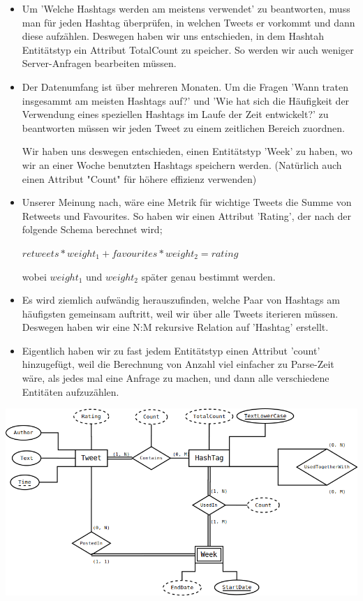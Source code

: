 \begin{itemize}
 \item Um 'Welche Hashtags werden am meistens verwendet' zu beantworten, muss man für jeden Hashtag überprüfen, in welchen Tweets er vorkommt und dann diese aufzählen. Deswegen haben wir uns entschieden, in dem Hashtah Entitätstyp ein Attribut TotalCount zu speicher. So werden wir auch weniger Server-Anfragen bearbeiten müssen.
 
 \item Der Datenumfang ist über mehreren Monaten. Um die Fragen 'Wann traten insgesammt am meisten Hashtags auf?' und 'Wie hat sich die Häufigkeit der Verwendung eines speziellen Hashtags im Laufe der Zeit entwickelt?' zu beantworten müssen wir jeden Tweet zu einem zeitlichen Bereich zuordnen. 
 
 Wir haben uns deswegen entschieden, einen Entitätstyp 'Week' zu haben, wo wir an einer Woche benutzten Hashtags speichern werden. (Natürlich auch einen Attribut "Count" für höhere effizienz verwenden)
 
 \item Unserer Meinung nach, wäre eine Metrik für wichtige Tweets die Summe von Retweets und Favourites. So haben wir einen Attribut 'Rating', der nach der folgende Schema berechnet wird;
 
 \begin{center}
 $retweets*weight_1 + favourites*weight_2 = rating$ 
 \end{center}
 
 wobei $weight_1$ und $weight_2$ später genau bestimmt werden.

 \item Es wird ziemlich aufwändig herauszufinden, welche Paar von Hashtags am häufigsten gemeinsam auftritt, weil wir über alle Tweets iterieren müssen. Deswegen haben wir eine N:M rekursive Relation auf 'Hashtag' erstellt.
 
 \item Eigentlich haben wir zu fast jedem Entitätstyp einen Attribut 'count' hinzugefügt, weil die Berechnung von Anzahl viel einfacher zu Parse-Zeit wäre, als jedes mal eine Anfrage zu machen, und dann alle verschiedene Entitäten aufzuzählen.
 
\end{itemize}

\vspace{1cm}
\includegraphics[width=\textwidth]{ERDiagramm.png}

